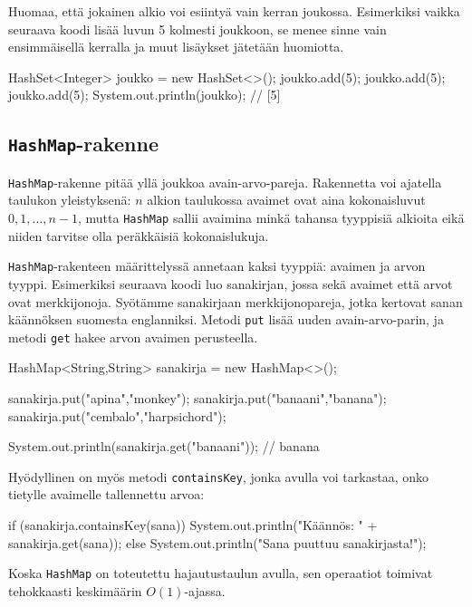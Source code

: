 Huomaa, että jokainen alkio voi esiintyä vain kerran joukossa.
Esimerkiksi vaikka seuraava koodi lisää luvun 5 kolmesti
joukkoon, se menee sinne vain ensimmäisellä kerralla ja
muut lisäykset jätetään huomiotta.

\begin{code}
HashSet<Integer> joukko = new HashSet<>();
joukko.add(5);
joukko.add(5);
joukko.add(5);
System.out.println(joukko); // [5]
\end{code}

\subsection{\texttt{HashMap}-rakenne}

\texttt{HashMap}-rakenne pitää yllä joukkoa avain-arvo-pareja.
Rakennetta voi ajatella taulukon yleistyksenä:
$n$ alkion taulukossa avaimet ovat aina kokonaisluvut
$0,1,\ldots,n-1$, mutta \texttt{HashMap} sallii
avaimina minkä tahansa tyyppisiä alkioita eikä niiden
tarvitse olla peräkkäisiä kokonaislukuja.

\texttt{HashMap}-rakenteen määrittelyssä annetaan
kaksi tyyppiä: avaimen ja arvon tyyppi.
Esimerkiksi seuraava koodi luo sanakirjan, jossa sekä
avaimet että arvot ovat merkkijonoja.
Syötämme sanakirjaan merkkijonopareja, jotka kertovat
sanan käännöksen suomesta englanniksi.
Metodi \texttt{put} lisää uuden avain-arvo-parin,
ja metodi \texttt{get} hakee arvon avaimen perusteella.

\begin{code}
HashMap<String,String> sanakirja = new HashMap<>();

sanakirja.put("apina","monkey");
sanakirja.put("banaani","banana");
sanakirja.put("cembalo","harpsichord");

System.out.println(sanakirja.get("banaani")); // banana
\end{code}

Hyödyllinen on myös metodi \texttt{containsKey},
jonka avulla voi tarkastaa, onko tietylle avaimelle
tallennettu arvoa:

\begin{code}
if (sanakirja.containsKey(sana)) {
    System.out.println("Käännös: " + sanakirja.get(sana));
} else {
    System.out.println("Sana puuttuu sanakirjasta!");
}
\end{code}

Koska \texttt{HashMap} on toteutettu hajautustaulun avulla,
sen operaatiot toimivat tehokkaasti keskimäärin $O(1)$-ajassa.

